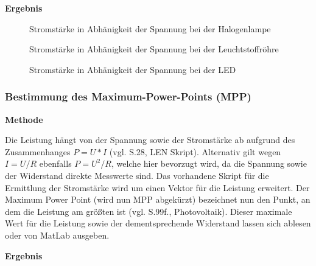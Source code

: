         \vspace{5mm}
        \textbf{Ergebnis}
        \newline
        
        \begin{figure}[H]
            \def\svgwidth{\textwidth}
            
            
            \caption{Stromstärke in Abhänigkeit der Spannung bei der Halogenlampe}
        \end{figure}
        
        \begin{figure}[H]
            \def\svgwidth{\textwidth}
            
            
            \caption{Stromstärke in Abhänigkeit der Spannung bei der Leuchtstoffröhre}
        \end{figure}
        
        \begin{figure}[H]
            \def\svgwidth{\textwidth}
            
            
            \caption{Stromstärke in Abhänigkeit der Spannung bei der LED}
        \end{figure}

    \subsubsection{Bestimmung des Maximum-Power-Points (MPP)}           %
        \textbf{Methode}
        \newline
        \par Die Leistung hängt von der Spannung sowie der Stromstärke ab aufgrund des Zusammenhanges $P=U*I$ (vgl. S.28, LEN Skript). Alternativ gilt wegen $I=U/R$ ebenfalls $P=U^2/R$, welche hier bevorzugt wird, da die Spannung sowie der Widerstand direkte Messwerte sind. Das vorhandene Skript für die Ermittlung der Stromstärke wird um einen Vektor für die Leistung erweitert.
        Der Maximum Power Point (wird nun MPP abgekürzt) bezeichnet nun den Punkt, an dem die Leistung am größten ist (vgl. S.99f., Photovoltaik). Dieser maximale Wert für die Leistung sowie der dementsprechende Widerstand lassen sich ablesen oder von MatLab ausgeben. 
        
        \vspace{4mm}
        \noindent
        \textbf{Ergebnis}
   
